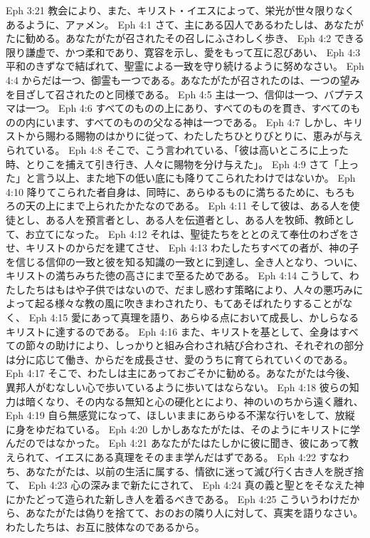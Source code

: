 Eph 3:21  教会により、また、キリスト・イエスによって、栄光が世々限りなくあるように、アァメン。
Eph 4:1  さて、主にある囚人であるわたしは、あなたがたに勧める。あなたがたが召されたその召しにふさわしく歩き、
Eph 4:2  できる限り謙虚で、かつ柔和であり、寛容を示し、愛をもって互に忍びあい、
Eph 4:3  平和のきずなで結ばれて、聖霊による一致を守り続けるように努めなさい。
Eph 4:4  からだは一つ、御霊も一つである。あなたがたが召されたのは、一つの望みを目ざして召されたのと同様である。
Eph 4:5  主は一つ、信仰は一つ、バプテスマは一つ。
Eph 4:6  すべてのものの上にあり、すべてのものを貫き、すべてのものの内にいます、すべてのものの父なる神は一つである。
Eph 4:7  しかし、キリストから賜わる賜物のはかりに従って、わたしたちひとりびとりに、恵みが与えられている。
Eph 4:8  そこで、こう言われている、「彼は高いところに上った時、とりこを捕えて引き行き、人々に賜物を分け与えた」。
Eph 4:9  さて「上った」と言う以上、また地下の低い底にも降りてこられたわけではないか。
Eph 4:10  降りてこられた者自身は、同時に、あらゆるものに満ちるために、もろもろの天の上にまで上られたかたなのである。
Eph 4:11  そして彼は、ある人を使徒とし、ある人を預言者とし、ある人を伝道者とし、ある人を牧師、教師として、お立てになった。
Eph 4:12  それは、聖徒たちをととのえて奉仕のわざをさせ、キリストのからだを建てさせ、
Eph 4:13  わたしたちすべての者が、神の子を信じる信仰の一致と彼を知る知識の一致とに到達し、全き人となり、ついに、キリストの満ちみちた徳の高さにまで至るためである。
Eph 4:14  こうして、わたしたちはもはや子供ではないので、だまし惑わす策略により、人々の悪巧みによって起る様々な教の風に吹きまわされたり、もてあそばれたりすることがなく、
Eph 4:15  愛にあって真理を語り、あらゆる点において成長し、かしらなるキリストに達するのである。
Eph 4:16  また、キリストを基として、全身はすべての節々の助けにより、しっかりと組み合わされ結び合わされ、それぞれの部分は分に応じて働き、からだを成長させ、愛のうちに育てられていくのである。
Eph 4:17  そこで、わたしは主にあっておごそかに勧める。あなたがたは今後、異邦人がむなしい心で歩いているように歩いてはならない。
Eph 4:18  彼らの知力は暗くなり、その内なる無知と心の硬化とにより、神のいのちから遠く離れ、
Eph 4:19  自ら無感覚になって、ほしいままにあらゆる不潔な行いをして、放縦に身をゆだねている。
Eph 4:20  しかしあなたがたは、そのようにキリストに学んだのではなかった。
Eph 4:21  あなたがたはたしかに彼に聞き、彼にあって教えられて、イエスにある真理をそのまま学んだはずである。
Eph 4:22  すなわち、あなたがたは、以前の生活に属する、情欲に迷って滅び行く古き人を脱ぎ捨て、
Eph 4:23  心の深みまで新たにされて、
Eph 4:24  真の義と聖とをそなえた神にかたどって造られた新しき人を着るべきである。
Eph 4:25  こういうわけだから、あなたがたは偽りを捨てて、おのおの隣り人に対して、真実を語りなさい。わたしたちは、お互に肢体なのであるから。
